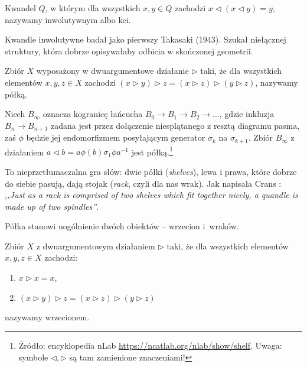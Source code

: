 \begin{definition}
%
%
    Kwandel $Q$, w którym dla wszystkich $x, y \in Q$ zachodzi $x \triangleleft (x \triangleleft y) = y$, nazywamy inwolutywnym albo kei.
\end{definition}

Kwandle inwolutywne badał jako pierwszy Takasaki (1943).
%
Szukał niełącznej struktury, która dobrze opisywałaby odbicia w skończonej geometrii.

\begin{definition}[półka]
%
    Zbiór $X$ wyposażony w dwuargumentowe działanie $\triangleright$ taki, że dla wszystkich elementów $x, y, z \in X$ zachodzi $(x \triangleright y) \triangleright z = (x \triangleright z) \triangleright (y \triangleright z)$, nazywamy półką.
\end{definition}

\begin{example}
%
    Niech $B_\infty$ oznacza kogranicę łańcucha $B_0 \to B_1 \to B_2 \to \ldots$, gdzie inkluzja $B_{n} \to B_{n+1}$ zadana jest przez dołączenie niesplątanego z resztą diagramu pasma, zaś $\phi$ będzie jej endomorfizmem posyłającym generator $\sigma_k$ na $\sigma_{k+1}$.
    Zbiór $B_\infty$ z działaniem $a \triangleleft b = a\phi(b)\sigma_1 \phi{a} ^{-1}$ jest półką.\footnote{Źródło: encyklopedia nLab \url{https://ncatlab.org/nlab/show/shelf}. Uwaga: symbole $\triangleleft, \triangleright$ są tam zamienione znaczeniami!}
\end{example}

To nieprzetłumaczalna gra słów: dwie półki (\emph{shelves}), lewa i prawa, które dobrze do siebie pasują, dają stojak (\emph{rack}, czyli dla nas wrak).
Jak napisała Crans \cite[s. 86]{crans2004}: \emph{,,Just as a rack is comprised of two shelves which fit together nicely, a quandle is made up of two spindles''}.
%

Półka stanowi uogólnienie dwóch obiektów -- wrzecion i~wraków.

\begin{definition}[wrzeciono]
%
    Zbiór $X$ z dwuargumentowym działaniem $\triangleright$ taki, że dla wszystkich elementów $x, y, z \in X$ zachodzi:
    \begin{enumerate}
        \item $x \triangleright x = x$,
        \item $(x \triangleright y) \triangleright z = (x \triangleright z) \triangleright (y \triangleright z)$
    \end{enumerate}
    nazywamy wrzecionem.
\end{definition}

